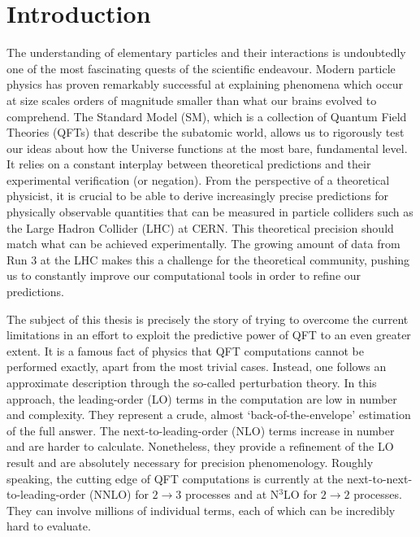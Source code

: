 \documentclass[main.tex]{subfiles}
\begin{document}
\chapter{Introduction} \label{sec:intro}
The understanding of elementary particles and their interactions is undoubtedly one of the most fascinating quests of the scientific endeavour. Modern particle physics has proven remarkably successful at explaining phenomena which occur at size scales orders of magnitude smaller than what our brains evolved to comprehend. The Standard Model (SM), which is a collection of Quantum Field Theories (QFTs) that describe the subatomic world, allows us to rigorously test our ideas about how the Universe functions at the most bare, fundamental level. It relies on a constant interplay between theoretical predictions and their experimental verification (or negation). From the perspective of a theoretical physicist, it is crucial to be able to derive increasingly precise predictions for physically observable quantities that can be measured in particle colliders such as the Large Hadron Collider (LHC) at CERN. This theoretical precision should match what can be achieved experimentally. The growing amount of data from Run 3 at the LHC makes this a challenge for the theoretical community, pushing us to constantly improve our computational tools in order to refine our predictions. 

The subject of this thesis is precisely the story of trying to overcome the current limitations in an effort to exploit the predictive power of QFT to an even greater extent. It is a famous fact of physics that QFT computations cannot be performed exactly, apart from the most trivial cases. Instead, one follows an approximate description through the so-called perturbation theory. In this approach, the leading-order (LO) terms in the computation are low in number and complexity. They represent a crude, almost `back-of-the-envelope' estimation of the full answer. The next-to-leading-order (NLO) terms increase in number and are harder to calculate. Nonetheless, they provide a refinement of the LO result and are absolutely necessary for precision phenomenology. Roughly speaking, the cutting edge of QFT computations is currently at the next-to-next-to-leading-order (NNLO) for $2 \rightarrow 3$ processes and at N$^3$LO for $2 \rightarrow 2$ processes. They can involve millions of individual terms, each of which can be incredibly hard to evaluate. 
\end{document}
